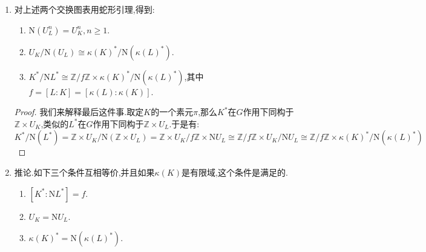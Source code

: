 \begin{enumerate}
\begin{proof}
    	以第二个交换图为例.设$\pi$是$K$的素元,按照扩张是非分歧的,有$\pi$也是$L$的素元.设$G=\mathrm{Gal}(L/K)=\{\sigma_1,\cdots,\sigma_s\}$.任取$1+\pi^na\in U^n_L/U^{n+1}_L$,那么它同构到$\kappa(L)^*$中为$a$,再取迹得到$\mathrm{Tr}(a)$.另一方面$\mathrm{N}(1+\pi^na)=\prod_{\sigma}(1+\pi^n\sigma(a))=1+\pi^n\sum_{\sigma}\sigma(a)+\cdots$,这里余项落在$\mathfrak{n}^{2n}$中,所以在$\mathrm{mod}U_L^{n+1}$下有$\mathrm{N}(1+\pi^na)=1+\pi^n\sum\sigma(a)$,它同构到$\kappa(K)^*$中为$\sum\sigma(a)$.按照$\mathrm{Gal}(L/K)\to\mathrm{Gal}(\kappa(L)/\kappa(K))$是同构,就得到这里$\sum\sigma(a)=\mathrm{Tr}(a)$,得证.
    \end{proof}
    \item 对上述两个交换图表用蛇形引理,得到:
    \begin{enumerate}
    	\item $\mathrm{N}(U_L^n)=U_K^n,n\ge1$.
    	\item $U_K/\mathrm{N}(U_L)\cong\kappa(K)^*/\mathrm{N}(\kappa(L)^*)$.
    	\item $K^*/\mathrm{N}L^*\cong\mathbb{Z}/f\mathbb{Z}\times\kappa(K)^*/\mathrm{N}(\kappa(L)^*)$,其中$f=[L:K]=[\kappa(L):\kappa(K)]$.
    \end{enumerate}
    \begin{proof}
    	
    	我们来解释最后这件事.取定$K$的一个素元$\pi$,那么$K^*$在$G$作用下同构于$\mathbb{Z}\times U_K$,类似的$L^*$在$G$作用下同构于$\mathbb{Z}\times U_L$.于是有:
    	$$K^*/\mathrm{N}(L^*)=\mathbb{Z}\times U_K/\mathrm{N}(\mathbb{Z}\times U_L)=\mathbb{Z}\times U_K/f\mathbb{Z}\times\mathrm{N}U_L\cong\mathbb{Z}/f\mathbb{Z}\times U_K/\mathrm{N}U_L\cong\mathbb{Z}/f\mathbb{Z}\times\kappa(K)^*/\mathrm{N}(\kappa(L)^*)$$
    \end{proof}
    \item 推论.如下三个条件互相等价,并且如果$\kappa(K)$是有限域,这个条件是满足的.
    \begin{enumerate}
    	\item $[K^*:\mathrm{N}L^*]=f$.
    	\item $U_K=\mathrm{N}U_L$.
    	\item $\kappa(K)^*=\mathrm{N}(\kappa(L)^*)$.
    \end{enumerate}
\end{enumerate}

